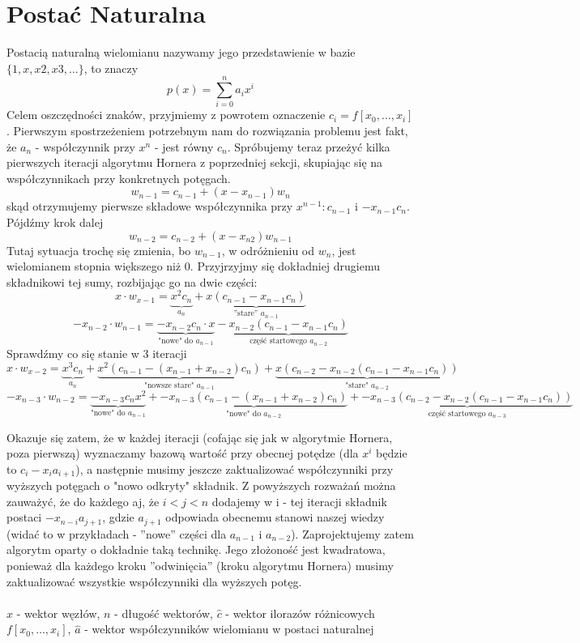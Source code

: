 \documentclass[10pt]{article}
\begin{document}
\section{Postać Naturalna}
Postacią naturalną wielomianu nazywamy jego przedstawienie w bazie $\{1, x, x2, x3, \dots\}$, to znaczy
\[p(x) = \sum_{i=0}^n a_ix^i\]
Celem oszczędności znaków, przyjmiemy z powrotem oznaczenie $c_i=f[x_0,\dots,x_i]$. Pierwszym spostrzeżeniem potrzebnym nam do rozwiązania problemu jest fakt, że $a_n$ - współczynnik przy $x^n$ - jest równy $c_n$. Spróbujemy teraz przeżyć kilka pierwszych iteracji algorytmu Hornera z poprzedniej sekcji, skupiając się na współczynnikach przy konkretnych potęgach.
\[w_{n-1} = c_{n-1} + (x - x_{n-1})w_n\]
skąd otrzymujemy pierwsze składowe współczynnika przy $x^{n-1} : c_{n-1}$ i $ -x_{n-1}c_n$. Pójdźmy krok dalej
\[w_{n-2} = c_{n-2} + (x - x_{n2})w_{n-1}\]
Tutaj sytuacja trochę się zmienia, bo $w_{n-1}$, w odróżnieniu od $w_n$, jest wielomianem stopnia większego niż 0. Przyjrzyjmy się dokładniej drugiemu składnikowi tej sumy, rozbijając go na dwie części:
\[x\cdot w_{x-1} = \underbrace{x^2c_n}_{a_n} + \underbrace{x(c_{n-1} - x_{n-1}c_n)}_{\text{”stare” $a_{n-1}$}}\]
\[-x_{n-2}\cdot w_{n-1} = \underbrace{-x_{n-2}c_n\cdot x}_{\text{"nowe" do $a_{n-1}$}} - \underbrace{x_{n-2}(c_{n-1} - x_{n-1}c_n)}_{\text{część startowego $a_{n-2}$}} \]
Sprawdźmy co się stanie w 3 iteracji
\[x\cdot w_{x-2} = \underbrace{x^3c_n}_{a_n} + \underbrace{x^2(c_{n-1} - (x_{n-1}+x_{n-2}) c_n)}_{\text{"nowsze stare" $a_{n-1}$}} + \underbrace{x(c_{n-2} - x_{n-2}(c_{n-1} - x_{n-1} c_n))}_{\text{"stare" $a_{n-2}$}}\]
\[ -x_{n-3}\cdot w_{n-2} = \underbrace{ -x_{n-3} c_n x^2 }_{\text{"nowe" do $a_{n-1}$}} + \underbrace{ -x_{n-3} ( c_{n-1} - ( x_{n-1} + x_{n-2} ) c_n ) }_{\text{"nowe" do $a_{n-2}$}} + \underbrace{ -x_{n-3} ( c_{n-2} - x_{n-2} ( c_{n-1} - x_{n-1} c_n ) ) }_{\text{część startowego $a_{n-3}$}} \]

Okazuje się zatem, że w każdej iteracji (cofając się jak w algorytmie Hornera, poza pierwszą) wyznaczamy bazową wartość przy obecnej potędze (dla $x^i$ będzie to $c_i - x_ia_{i+1}$), a następnie musimy jeszcze zaktualizować współczynniki przy wyższych potęgach o "nowo odkryty" składnik. Z powyższych rozważań można zauważyć, że do każdego aj, że $i < j < n$ dodajemy w i - tej iteracji składnik postaci $-x_{n-i}a_{j+1}$, gdzie $a_{j+1}$ odpowiada obecnemu stanowi naszej wiedzy (widać to w przykładach - ”nowe” części dla $a_{n-1}$ i $a_{n-2}$). Zaprojektujemy zatem algorytm oparty o dokładnie taką technikę. Jego złożoność jest kwadratowa, ponieważ dla każdego kroku ”odwinięcia” (kroku algorytmu Hornera) musimy zaktualizować wszystkie współczynniki dla wyższych potęg.\\\\
$\hat{x}$ - wektor węzłów, $n$ - długość wektorów, $\hat{c}$ - wektor ilorazów różnicowych $f[x_0,\dots,x_i]$, $\hat{a}$ - wektor współczynników wielomianu w postaci naturalnej
\end{document}
